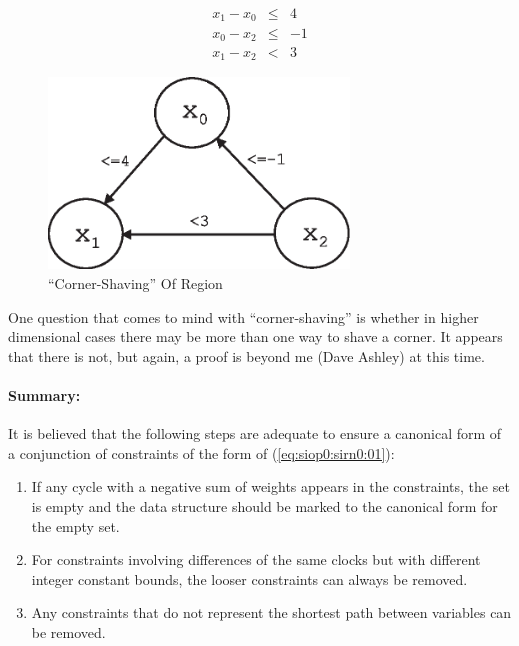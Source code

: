 \begin{eqnarray}
\label{eq:siop0:sirn0:scfs0:35} 
   x_1 - x_0 & \leq & 4     \\
\label{eq:siop0:sirn0:scfs0:36}
   x_0 - x_2 & \leq & -1     \\
\label{eq:siop0:sirn0:scfs0:37}
   x_1 - x_2 & <    & 3 
\end{eqnarray}

\begin{figure}
\centering
\includegraphics[height=2.0in]{s_iop0/leqeq01.eps}
\caption{``Corner-Shaving'' Of Region}
\label{fig:siop0:sirn0:scfs0:02}
\end{figure}

One question that comes to mind with ``corner-shaving'' is whether
in higher dimensional cases there may be more than one way to 
shave a corner.  It appears that there is not, but again, a proof
is beyond me (Dave Ashley) at this time.

\paragraph{Summary:}

It is believed that the following steps are adequate to ensure a canonical 
form of a conjunction of constraints of the form of
(\ref{eq:siop0:sirn0:01}):

\begin{enumerate}
\item If any cycle with a negative sum of weights appears in the constraints,
      the set is empty and the data structure should be marked to the
      canonical form for the empty set.
\item For constraints involving differences of the same clocks but with different 
      integer constant bounds, the looser constraints can always be removed.
\item Any constraints that do not represent the shortest path between variables
      can be removed.
\end{enumerate}

